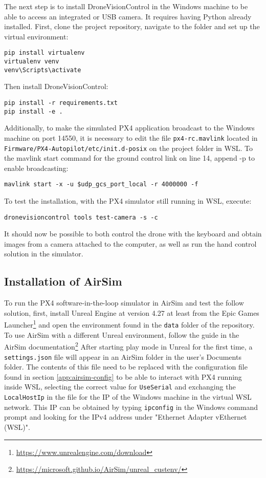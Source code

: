 The next step is to install DroneVisionControl in the Windows machine to be able to access an integrated or USB camera.
It requires having Python already installed.
First, clone the project repository, navigate to the folder and set up the virtual environment:
\begin{verbatim}
pip install virtualenv
virtualenv venv
venv\Scripts\activate
\end{verbatim}

Then install DroneVisionControl:
\begin{verbatim}
pip install -r requirements.txt
pip install -e .
\end{verbatim}

Additionally, to make the simulated PX4 application broadcast to the Windows machine on port 14550, it is necessary to edit the file \texttt{px4-rc.mavlink} located in \texttt{Firmware/PX4-Autopilot/etc/init.d-posix} on the project folder in WSL.
To the mavlink start command for the ground control link on line 14, append -p to enable broadcasting:
\begin{verbatim}
mavlink start -x -u $udp_gcs_port_local -r 4000000 -f
\end{verbatim}

To test the installation, with the PX4 simulator still running in WSL, execute:
\begin{verbatim}
dronevisioncontrol tools test-camera -s -c
\end{verbatim}
It should now be possible to both control the drone with the keyboard and obtain images from a camera attached to the computer, as well as run the hand control solution in the simulator.

\subsection{Installation of AirSim}

To run the PX4 software-in-the-loop simulator in AirSim and test the follow solution,
first, install Unreal Engine at version 4.27 at least from the Epic Games Launcher\footnote{\url{https://www.unrealengine.com/download}} and open the environment found in the \texttt{data} folder of the repository.
To use AirSim with a different Unreal environment, follow the guide in the AirSim documentation\footnote{\url{https://microsoft.github.io/AirSim/unreal_custenv/}}
After starting play mode in Unreal for the first time, a \texttt{settings.json} file will appear in an AirSim folder in the user's Documents folder.
The contents of this file need to be replaced with the configuration file found in section \ref{app:airsim-config} to be able to interact with PX4 running inside WSL, selecting the correct value for \texttt{UseSerial} and exchanging the \texttt{LocalHostIp} in the file for the IP of the Windows machine in the virtual WSL network.
This IP can be obtained by typing \texttt{ipconfig} in the Windows command prompt and looking for the IPv4 address under "Ethernet Adapter vEthernet (WSL)".

